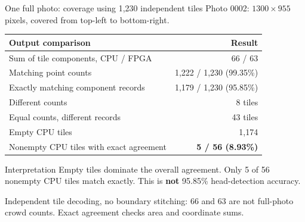 \documentclass[aspectratio=169,10pt]{beamer}
\begin{document}
\begin{frame}{One full photo: coverage using 1,230 independent tiles}
\small
Photo 0002: $1300\times955$ pixels, covered from top-left to bottom-right.\par\medskip
\begin{center}
\begin{tabular}{lr}
\toprule
\textbf{Output comparison} & \textbf{Result} \\
\midrule
Sum of tile components, CPU / FPGA & 66 / 63 \\
Matching point counts & 1,222 / 1,230 (99.35\%) \\
Exactly matching component records & 1,179 / 1,230 (95.85\%) \\
Different counts & 8 tiles \\
Equal counts, different records & 43 tiles \\
Empty CPU tiles & 1,174 \\
Nonempty CPU tiles with exact agreement & \textbf{5 / 56 (8.93\%)} \\
\bottomrule
\end{tabular}
\end{center}
\begin{alertblock}{Interpretation}
Empty tiles dominate the overall agreement. Only 5 of 56 nonempty CPU tiles match exactly. This is \textbf{not} 95.85\% head-detection accuracy.
\end{alertblock}
\scriptsize Independent tile decoding, no boundary stitching: 66 and 63 are not full-photo crowd counts. Exact agreement checks area and coordinate sums.
\end{frame}
\end{document}
